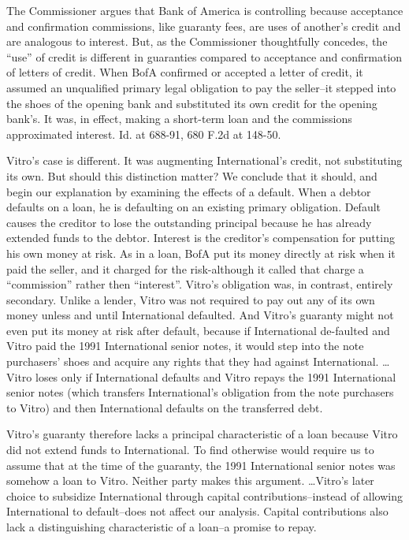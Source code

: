 \begin{select}
The Commissioner argues that Bank of America is controlling because acceptance and confirmation commissions, like guaranty fees, are uses of another's credit and are analogous to interest. But, as the Commissioner thoughtfully concedes, the ``use'' of credit is different in guaranties compared to acceptance and confirmation of letters of credit. When BofA confirmed or accepted a letter of credit, it assumed an unqualified primary legal obligation to pay the seller--it stepped into the shoes of the opening bank and substituted its own credit for the opening bank's. It was, in effect, making a short-term loan and the commissions approximated interest. Id. at 688-91, 680 F.2d at 148-50.

Vitro's case is different. It was augmenting International's credit, not substituting its own. But should this distinction matter? We conclude that it  should, and begin our explanation by examining the effects of a default. When a debtor defaults on a loan, he is defaulting on an existing primary obligation. Default causes the creditor to lose the outstanding principal because he has already extended funds to the debtor. Interest is the creditor's compensation for putting his own money at risk. As in a loan, BofA put its money directly at risk when it paid the seller, and it charged for the risk-although it called that charge a ``commission'' rather then ``interest''. Vitro's obligation was, in contrast, entirely secondary. Unlike a lender, Vitro was not required to pay out any of its own money unless and until International defaulted. And Vitro's guaranty might not even put its money at risk after default, because if International de-faulted and Vitro paid the 1991 International senior notes, it would step into the note purchasers' shoes and acquire any rights that they had against International. \ldots Vitro loses only if International defaults and Vitro repays the 1991 International senior notes (which transfers International's obligation from the note purchasers to Vitro) and then International defaults on the transferred debt.

Vitro's guaranty therefore lacks a principal characteristic of a loan because Vitro did not extend funds to International. To find otherwise would require us to assume that at the time of the guaranty, the 1991 International senior notes was somehow a loan to Vitro. Neither party makes this argument. \ldots Vitro's later choice to subsidize International through capital contributions--instead of allowing International to default--does not affect our analysis. Capital contributions also lack a distinguishing characteristic of a loan--a promise to repay.


\end{select}
